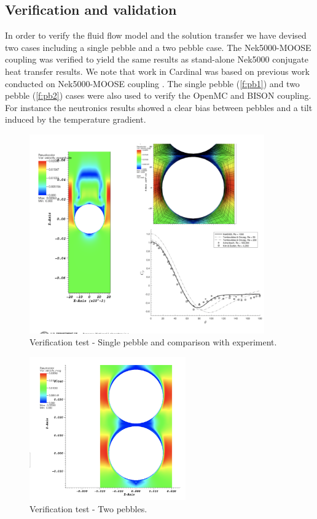 \subsection{Verification and validation}
\label{ss:c3}

In order to verify the fluid flow model and the solution transfer we have devised two cases including a single pebble and a two pebble case.
The Nek5000-MOOSE coupling was verified to yield the same results as stand-alone Nek5000 conjugate heat transfer results.
We note that work in Cardinal was based on previous work conducted on Nek5000-MOOSE coupling \cite{novak2018preliminary}.
The single pebble (\autoref{f:pb1}) and two pebble (\autoref{f:pb2}) cases were also used to verify the OpenMC and BISON coupling.
For instance the neutronics results showed a clear bias between pebbles and a tilt induced by the temperature gradient.

\begin{figure}[htb!]
\centering
\includegraphics[trim={0 0.5cm 0 0},clip=true,width=0.9\textwidth]{Figures/pb_vv1}
\caption{Verification test - Single pebble and comparison with experiment.}
\label{f:pb1}
\end{figure}

\begin{figure}[htb!]
\centering
\includegraphics[trim={0.1cm 0 0 0},clip=true,width=0.6\textwidth]{Figures/pb_vv2}
\caption{Verification test - Two pebbles.}
\label{f:pb2}
\end{figure}

